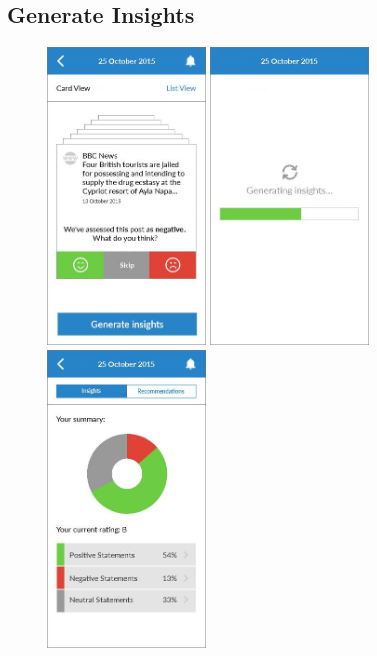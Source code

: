 \clearpage

\subsection{Generate Insights}

\begin{figure}
  \subfigures
  \centering
  \begin{minipage}{4.6cm}
    \centering
    \includegraphics[width=4.2cm]{inc/ui_insight_step1.jpg}
    \caption{}
    \label{fig:ui_insight_step1}
  \end{minipage}
  \begin{minipage}{4.6cm}
    \centering
    \includegraphics[width=4.2cm]{inc/ui_insight_step2.jpg}
    \caption{}
    \label{fig:ui_insight_step2}
  \end{minipage}
  \begin{minipage}{4.6cm}
    \centering
    \includegraphics[width=4.2cm]{inc/ui_insight_step3.jpg}

\end{minipage}
\end{figure}
